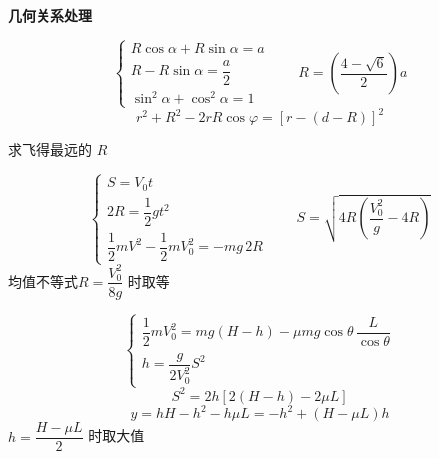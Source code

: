 \noindent \textbf{几何关系处理}

\[ \begin{cases} R\cos\alpha+R\sin\alpha=a\\ R-R\sin\alpha=\dfrac a2\\ \sin^2\alpha+\cos^2\alpha=1\end{cases}\qquad R=\left(\dfrac{4-\sqrt6}{2}\right)a \]
\[ r^2+R^2-2rR\cos\varphi=\left[r-(d-R)\right]^2 \]
\begin{problem}
求飞得最远的 $R$
\begin{solution}
\[ \begin{cases} S=V_0t\\ 2R=\dfrac12gt^2\\ \dfrac12mV^2-\dfrac12mV_0^2=-mg\,2R\end{cases}\qquad S=\sqrt{4R\left(\dfrac{V_0^2}{g}-4R\right)} \]
均值不等式\quad $R=\dfrac{V_0^2}{8g}$ 时取等
\end{solution}
\end{problem}
\begin{problem}
\begin{solution}
\[ \begin{cases} \dfrac12mV_0^2=mg(H-h)-\mu mg\cos\theta\,\dfrac{L}{\cos\theta}\\[6pt] h=\dfrac{g}{2V_0^2}S^2\end{cases} \]
\[ S^2=2h\left[2(H-h)-2\mu L\right] \]
\[ y=hH-h^2-h\mu L=-h^2+(H-\mu L)h \]
\noindent $h=\dfrac{H-\mu L}{2}$ 时取大值
\end{solution}
\end{problem}

